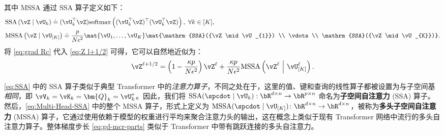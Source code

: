 \documentclass[../../book-main_zh.tex]{subfiles}
\begin{document}
其中 MSSA 通过 SSA 算子定义如下：
\begin{align}
    & \mathrm{SSA}\left(\vZ \mid \vU_{k}\right)
    \doteq (\vU_{k}^\top
    \vZ)\mathrm{softmax}\left((\vU_{k}^\top\vZ)^\top(\vU_{k}^\top\vZ)\right),
    \ \forall k \in [K], \label{eq:SSA} \\
    & \mathrm{MSSA}\left(\vZ \mid \vU_{[K]}\right)
    \doteq \frac{p}{N\epsilon^2} \mat{\vU_{1}, \dots,
    \vU_{K}}\mat{\mathrm{SSA}({\vZ \mid \vU_{1}}) \\ \vdots
    \\ \mathrm{SSA}({\vZ \mid \vU_{K}})}.\label{eq:Multi-Head-SSA}
\end{align}
将 \eqref{eq:grad Rc} 代入 \eqref{eq:Z l+1/2} 可得，它可以自然地近似为：
\begin{equation}
    \vZ^{\ell + 1/2} = \left(1 - \frac{\kappa p}{N\epsilon^2}\right)
    \vZ^{\ell} + \frac{\kappa p}{N\epsilon^2}
    \mathrm{MSSA}\left(\vZ^{\ell}\ \middle|\ \vU_{[K]}^{\ell}\right).
    \label{eq:gd-mcr-parts}
\end{equation}

\begin{remark}
    \eqref{eq:SSA} 中的 SSA 算子类似于典型 Transformer \citep{vaswani2017attention} 中的\textit{注意力算子}，不同之处在于，这里的值、键和查询的线性算子都被设置为与子空间基\textit{相同}，即 $\vV_{k} = \vK_{k} = \bm{Q}_{k} = \vU_k^*$。因此，我们将 $\mathrm{SSA}({\spcdot\mid\vU_k}): \bR^{d\times n} \rightarrow \bR^{p\times n}$ 命名为\textbf{子空间自注意力} (SSA) 算子。然后，\eqref{eq:Multi-Head-SSA} 中的整个 MSSA 算子，形式上定义为 \(\mathrm{MSSA}({\spcdot \mid \vU_{[K]}}) \colon \bR^{d \times n} \to \bR^{d \times n}\)，被称为\textbf{多头子空间自注意力} (MSSA) 算子，它通过使用依赖于模型的权重进行平均来聚合注意力头的输出，这在概念上类似于现有 Transformer 网络中流行的多头自注意力算子。整体梯度步长 \eqref{eq:gd-mcr-parts} 类似于 Transformer 中带有跳跃连接的多头自注意力。
\end{remark}
\end{document}
